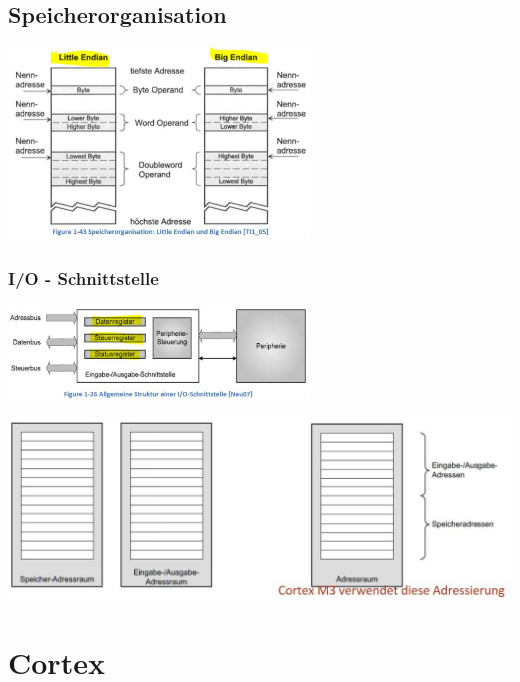 \subsection{Speicherorganisation}
\begin{multicols}{2}
\includegraphics[width=8cm]{images/LittleBigEndian}

\subsubsection{I/O - Schnittstelle}
\includegraphics[width=8cm]{images/IOSchnittstelle}
\end{multicols}

\includegraphics{images/Speicherraumadressierung}
\section{Cortex}
